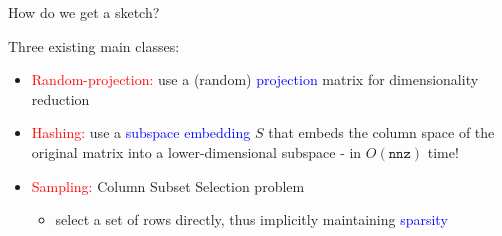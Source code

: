 \documentclass[first=dgreen,second=purple,logo=redque]{aaltoslides}
\newcommand{\vectornorm}[1]{\left\|#1\right\|}
\begin{document}
\begin{frame}[allowframebreaks=1]{How do we get a sketch?}

Three existing main classes:
\begin{itemize}
\item \textcolor{red}{Random-projection:} use a (random) \textcolor{blue}{projection} matrix for dimensionality reduction
\item \textcolor{red}{Hashing:} use a \textcolor{blue}{subspace embedding} $S$ that embeds the column space of the original matrix into a lower-dimensional subspace - in $O(\texttt{nnz})$ time!
	
\item \textcolor{red}{Sampling:} \textcolor{dgreen}{Column Subset Selection problem}
	\begin{itemize}
		\item select a set of rows directly, thus \textcolor{dgreen}{implicitly} maintaining \textcolor{blue}{sparsity}
	\end{itemize}


\end{itemize}
\end{frame}
\end{document}
